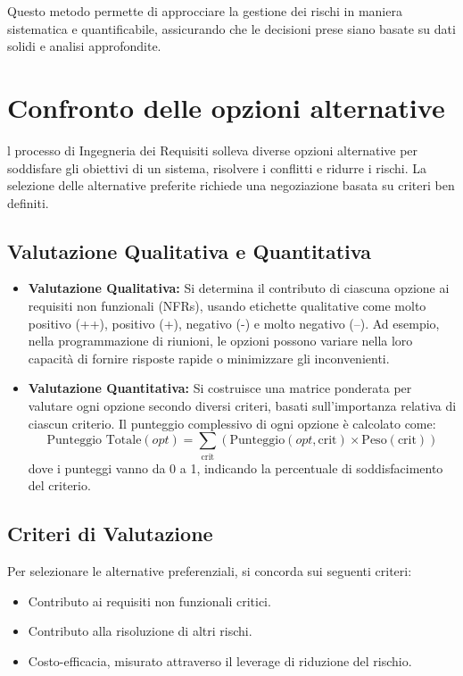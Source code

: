 Questo metodo permette di approcciare la gestione dei rischi in maniera sistematica
e quantificabile, assicurando che le decisioni prese siano basate su dati solidi e
analisi approfondite.

\section{Confronto delle opzioni alternative}
l processo di Ingegneria dei Requisiti solleva diverse opzioni alternative per
soddisfare gli obiettivi di un sistema, risolvere i conflitti e ridurre i rischi. 
La selezione delle alternative preferite richiede una negoziazione basata su criteri 
ben definiti.

\subsection{Valutazione Qualitativa e Quantitativa}
\begin{itemize}
    \item \textbf{Valutazione Qualitativa:} Si determina il contributo di ciascuna 
    opzione ai requisiti non funzionali (NFRs), usando etichette qualitative come 
    molto positivo (++), positivo (+), negativo (-) e molto negativo (--). Ad esempio, 
    nella programmazione di riunioni, le opzioni possono variare nella loro capacità 
    di fornire risposte rapide o minimizzare gli inconvenienti.
    \item \textbf{Valutazione Quantitativa:} Si costruisce una matrice ponderata 
    per valutare ogni opzione secondo diversi criteri, basati sull'importanza 
    relativa di ciascun criterio. Il punteggio complessivo di ogni opzione è 
    calcolato come:
    \[
    \text{Punteggio Totale} (opt) = \sum_{\text{crit}} (\text{Punteggio} 
    (opt, \text{crit}) \times \text{Peso} (\text{crit}))
    \]
    dove i punteggi vanno da 0 a 1, indicando la percentuale di soddisfacimento 
    del criterio.
\end{itemize}

\subsection{Criteri di Valutazione}
Per selezionare le alternative preferenziali, si concorda sui seguenti criteri:
\begin{itemize}
    \item Contributo ai requisiti non funzionali critici.
    \item Contributo alla risoluzione di altri rischi.
    \item Costo-efficacia, misurato attraverso il leverage di riduzione del rischio.
\end{itemize}

